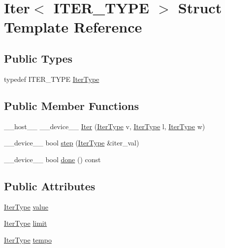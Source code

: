 \hypertarget{structIter}{\section{Iter$<$ I\-T\-E\-R\-\_\-\-T\-Y\-P\-E $>$ Struct Template Reference}
\label{structIter}
}
\subsection*{Public Types}
\begin{DoxyCompactItemize}
\item 
typedef I\-T\-E\-R\-\_\-\-T\-Y\-P\-E \hyperlink{structIter_aed35141b27fcf39c30a883888c0b6a6c}{Iter\-Type}
\end{DoxyCompactItemize}
\subsection*{Public Member Functions}
\begin{DoxyCompactItemize}
\item 
\-\_\-\-\_\-host\-\_\-\-\_\- \-\_\-\-\_\-device\-\_\-\-\_\- \hyperlink{structIter_a10721610cd79e7843dee380d8d5d7628}{Iter} (\hyperlink{structIter_aed35141b27fcf39c30a883888c0b6a6c}{Iter\-Type} v, \hyperlink{structIter_aed35141b27fcf39c30a883888c0b6a6c}{Iter\-Type} l, \hyperlink{structIter_aed35141b27fcf39c30a883888c0b6a6c}{Iter\-Type} w)
\item 
\-\_\-\-\_\-device\-\_\-\-\_\- bool \hyperlink{structIter_a5f0607dcce3f03d67d33cc6bb84c097a}{step} (\hyperlink{structIter_aed35141b27fcf39c30a883888c0b6a6c}{Iter\-Type} \&iter\-\_\-val)
\item 
\-\_\-\-\_\-device\-\_\-\-\_\- bool \hyperlink{structIter_af9bd6e028ed396e26d5ccbe5d743c832}{done} () const 
\end{DoxyCompactItemize}
\subsection*{Public Attributes}
\begin{DoxyCompactItemize}
\item 
\hyperlink{structIter_aed35141b27fcf39c30a883888c0b6a6c}{Iter\-Type} \hyperlink{structIter_aeb1ab085577c3d26dcc3ae52a3b452e8}{value}
\item 
\hyperlink{structIter_aed35141b27fcf39c30a883888c0b6a6c}{Iter\-Type} \hyperlink{structIter_a1598d0eda557abbdc9586e48fd43e976}{limit}
\item 
\hyperlink{structIter_aed35141b27fcf39c30a883888c0b6a6c}{Iter\-Type} \hyperlink{structIter_a151cfe1f2432438792333d6b1eced4c0}{tempo}
\end{DoxyCompactItemize}


